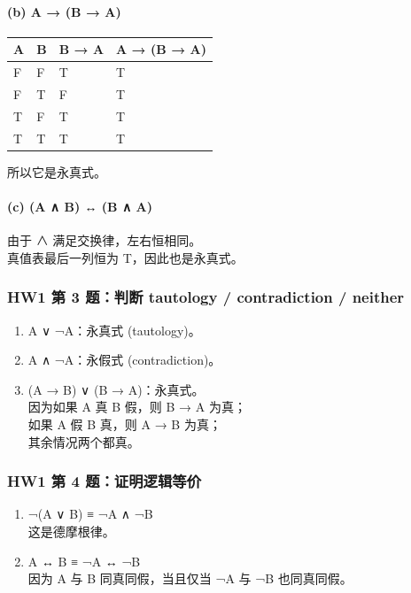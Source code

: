 \documentclass[
  11pt,
]{article}
\providecommand{\tightlist}{%
  \setlength{\itemsep}{0pt}\setlength{\parskip}{0pt}}
\begin{document}
\paragraph{(b) A → (B → A)}\label{b-a-b-a}

\begin{longtable}[]{@{}llll@{}}
\toprule\noalign{}
A & B & B → A & A → (B → A) \\
\midrule\noalign{}
\endhead
\bottomrule\noalign{}
\endlastfoot
F & F & T & T \\
F & T & F & T \\
T & F & T & T \\
T & T & T & T \\
\end{longtable}

所以它是永真式。

\paragraph{(c) (A ∧ B) ↔ (B ∧ A)}\label{c-a-b-b-a}

由于 ∧ 满足交换律，左右恒相同。\\
真值表最后一列恒为 T，因此也是永真式。

\subsubsection{HW1 第 3 题：判断 tautology / contradiction /
neither}\label{hw1-ux7b2c-3-ux9898ux5224ux65ad-tautology-contradiction-neither}

\begin{enumerate}
\def\labelenumi{\arabic{enumi}.}
\tightlist
\item
  A ∨ ¬A：永真式 (tautology)。
\item
  A ∧ ¬A：永假式 (contradiction)。
\item
  (A → B) ∨ (B → A)：永真式。\\
  因为如果 A 真 B 假，则 B → A 为真；\\
  如果 A 假 B 真，则 A → B 为真；\\
  其余情况两个都真。
\end{enumerate}

\subsubsection{HW1 第 4
题：证明逻辑等价}\label{hw1-ux7b2c-4-ux9898ux8bc1ux660eux903bux8f91ux7b49ux4ef7}

\begin{enumerate}
\def\labelenumi{\arabic{enumi}.}
\item
  ¬(A ∨ B) ≡ ¬A ∧ ¬B\\
  这是德摩根律。
\item
  A ↔ B ≡ ¬A ↔ ¬B\\
  因为 A 与 B 同真同假，当且仅当 ¬A 与 ¬B 也同真同假。
\end{enumerate}
\end{document}
